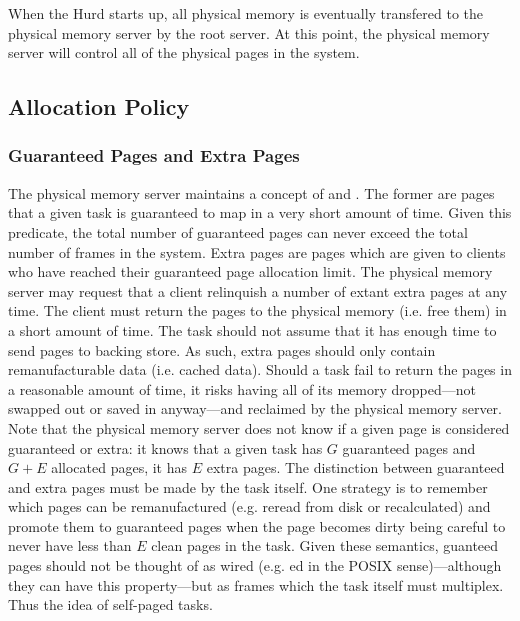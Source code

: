 When the Hurd starts up, all physical memory is eventually transfered
to the physical memory server by the root server.  At this point, the
physical memory server will control all of the physical pages in the
system.

\subsection{Allocation Policy}

\subsubsection{Guaranteed Pages and Extra Pages}

The physical memory server maintains a concept of  and .  The former are pages that a given
task is guaranteed to map in a very short amount of time.  Given this
predicate, the total number of guaranteed pages can never exceed the
total number of frames in the system.  Extra pages are pages which are
given to clients who have reached their guaranteed page allocation
limit.  The physical memory server may request that a client
relinquish a number of extant extra pages at any time.  The client
must return the pages to the physical memory (i.e. free them) in a
short amount of time.  The task should not assume that it has enough
time to send pages to backing store.  As such, extra pages should only
contain remanufacturable data (i.e. cached data).  Should a task fail
to return the pages in a reasonable amount of time, it risks having
all of its memory dropped---not swapped out or saved in anyway---and
reclaimed by the physical memory server.  Note that the physical
memory server does not know if a given page is considered guaranteed
or extra: it knows that a given task has $G$ guaranteed pages and $G +
E$ allocated pages, it has $E$ extra pages.  The distinction between
guaranteed and extra pages must be made by the task itself.  One
strategy is to remember which pages can be remanufactured (e.g. reread
from disk or recalculated) and promote them to guaranteed pages when
the page becomes dirty being careful to never have less than $E$ clean
pages in the task.  Given these semantics, guanteed pages should not
be thought of as wired (e.g. ed in the POSIX
sense)---although they can have this property---but as frames which
the task itself must multiplex.  Thus the idea of self-paged tasks.

